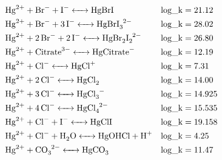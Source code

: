 \documentclass[12pt, a4paper]{article}
\begin{document}
\begin{align}
& \ce{Hg^2+ + Br^- + I- <-> HgBrI} && \mathrm{log\_k} = 21.12 \\
& \ce{Hg^2+ + Br^- + 3I- <-> HgBrI_3^2-} && \mathrm{log\_k} = 28.02 \\
& \ce{Hg^2+ + 2Br^- + 2I- <-> HgBr_2I_2^2-} && \mathrm{log\_k} = 26.80 \\
& \ce{Hg^2+ + Citrate^3- <-> HgCitrate-} && \mathrm{log\_k} = 12.19 \\
& \ce{Hg^2+ + Cl^- <-> HgCl^+} && \mathrm{log\_k} = 7.31 \\
& \ce{Hg^2+ + 2Cl^- <-> HgCl2} && \mathrm{log\_k} = 14.00 \\
& \ce{Hg^2+ + 3Cl^- <-> HgCl_3^-} && \mathrm{log\_k} = 14.925 \\
& \ce{Hg^2+ + 4Cl^- <-> HgCl_4^2-} && \mathrm{log\_k} = 15.535 \\
& \ce{Hg^2+ + Cl^- + I- <-> HgClI} && \mathrm{log\_k} = 19.158 \\
& \ce{Hg^2+ + Cl^- + H2O <-> HgOHCl + H+} && \mathrm{log\_k} = 4.25 \\
& \ce{Hg^2+ + CO3^2- <-> HgCO3} && \mathrm{log\_k} = 11.47 \\

\end{align}
\end{document}
